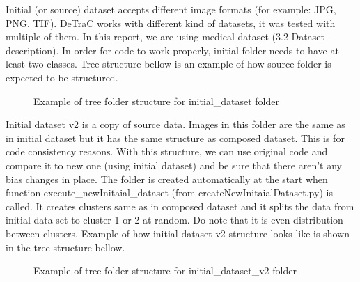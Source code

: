 Initial (or source) dataset accepts different image formats (for example: JPG, PNG, TIF). DeTraC works with different kind of datasets, it was tested with multiple of them. In this report, we are using medical dataset (3.2 Dataset description). In order for code to work properly, initial folder needs to have at least two classes. Tree structure bellow is an example of how source folder is expected to be structured. 
\begin{figure}[!ht]
    \caption{Example of tree folder structure for initial{\_}dataset folder}
\end{figure}
\newpage

Initial dataset v2 is a copy of source data. Images in this folder are the same as in initial dataset but it has the same structure as composed dataset. This is for code consistency reasons. With this structure, we can use original code and compare it to new one (using initial dataset) and be sure that there aren't any bias changes in place. The folder is created automatically at the start when function execute{\_}newInitaial{\_}dataset (from createNewInitaialDataset.py) is called. It creates clusters same as in composed dataset and it splits the data from initial data set to cluster 1 or 2 at random. Do note that it is even distribution between clusters. Example of how initial dataset v2 structure looks like is shown in the tree structure bellow.
\begin{figure}[!ht]
    \caption{Example of tree folder structure for initial{\_}dataset{\_}v2 folder}
\end{figure}